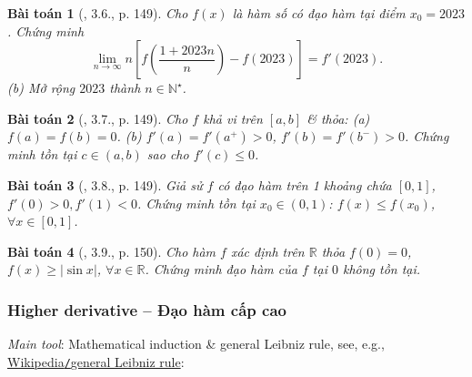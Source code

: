 \documentclass{article}
\newtheorem{baitoan}{Bài toán}
\begin{document}
\begin{baitoan}[\cite{Quoc_Long_Dat_Nam_VMC}, 3.6., p. 149]
	Cho $f(x)$ là hàm số có đạo hàm tại điểm $x_0 = 2023$. Chứng minh
	\begin{equation*}
		\lim_{n\to\infty} n\left[f\left(\frac{1 + 2023n}{n}\right) - f(2023)\right] = f'(2023).
	\end{equation*}
	(b) Mở rộng $2023$ thành $n\in\mathbb{N}^\star$.
\end{baitoan}

\begin{baitoan}[\cite{Quoc_Long_Dat_Nam_VMC}, 3.7., p. 149]
	Cho $f$ khả vi trên $[a,b]$ \& thỏa: (a) $f(a) = f(b) = 0$. (b) $f'(a) = f'(a^+) > 0$, $f'(b) = f'(b^-) > 0$. Chứng minh tồn tại $c\in(a,b)$ sao cho $f'(c)\le0$.
\end{baitoan}

\begin{baitoan}[\cite{Quoc_Long_Dat_Nam_VMC}, 3.8., p. 149]
	Giả sử $f$ có đạo hàm trên 1 khoảng chứa $[0,1]$, $f'(0) > 0,f'(1) < 0$. Chứng minh tồn tại $x_0\in(0,1)$: $f(x)\le f(x_0)$, $\forall x\in[0,1]$.
\end{baitoan}

\begin{baitoan}[\cite{Quoc_Long_Dat_Nam_VMC}, 3.9., p. 150]
	Cho hàm $f$ xác định trên $\mathbb{R}$ thỏa $f(0) = 0$, $f(x)\ge|\sin x|$, $\forall x\in\mathbb{R}$. Chứng minh đạo hàm của $f$ tại $0$ không tồn tại.
\end{baitoan}


\subsubsection{Higher derivative -- Đạo hàm cấp cao}
{\it Main tool}: Mathematical induction \& general Leibniz rule, see, e.g., \href{https://en.wikipedia.org/wiki/General_Leibniz_rule}{Wikipedia{\tt/}general Leibniz rule}:
\end{document}
